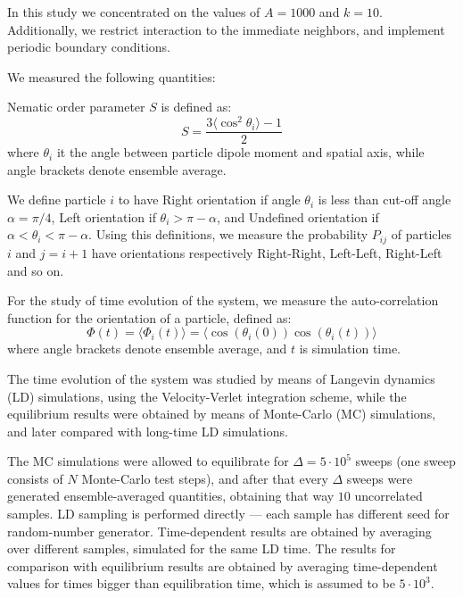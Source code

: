 \documentclass[12pt, a4paper]{article}
\begin{document}
In this study we concentrated on the values of $A = 1000$ and $k = 10$.
Additionally, we restrict interaction to the immediate neighbors, and implement periodic boundary conditions.

We measured the following quantities:

Nematic order parameter $S$ is defined as:
\begin{equation}
\label{eq:nematic_order_parameter}
	S = \frac{3 \langle\cos^2 \theta_i\rangle - 1}{2}
\end{equation}
where $\theta_i$ it the angle between particle dipole moment and spatial axis, while angle brackets denote ensemble average.

We define particle $i$ to have Right orientation if angle $\theta_i$ is less than cut-off angle $\alpha = \pi/4$, Left orientation if $\theta_i > \pi - \alpha$, and Undefined orientation if $\alpha < \theta_i < \pi - \alpha$. 
Using this definitions, we measure the probability $P_{ij}$ of particles $i$ and $j = i+1$ have orientations respectively Right-Right, Left-Left, Right-Left and so on.

For the study of time evolution of the system, we measure the auto-correlation function for the orientation of a particle, defined as:
\begin{equation}
\label{eq:auto_corr_function}
 \Phi(t) = \langle\Phi_i(t)\rangle = \langle\cos (\theta_i(0)) \cos (\theta_i(t))\rangle
\end{equation}
where angle brackets denote ensemble average, and $t$ is simulation time.

The time evolution of the system was studied by means of Langevin dynamics (LD) simulations, using the Velocity-Verlet integration scheme, while the equilibrium results were obtained by means of Monte-Carlo (MC) simulations, and later compared with long-time LD simulations.

The MC simulations were allowed to equilibrate for $\Delta = 5 \cdot 10^5$ sweeps (one sweep consists of $N$ Monte-Carlo test steps), and after that every $\Delta$ sweeps were generated ensemble-averaged quantities, obtaining that way $10$ uncorrelated samples. LD sampling is performed directly --- each sample has different seed for random-number generator. Time-dependent results are obtained by averaging over different samples, simulated for the same LD time. The results for comparison with equilibrium results are obtained by averaging time-dependent values for times bigger than equilibration time, which is assumed to be $5 \cdot 10^3$.
\end{document}
